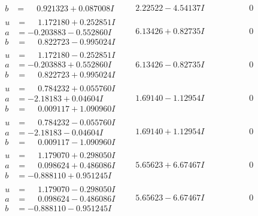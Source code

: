\documentclass[1p]{elsarticle_modified}
\theoremstyle{definition}
\begin{document}
$$\begin{array}{c|c|c}
\begin{aligned}
b &= \phantom{-}0.921323 + 0.087008 I\end{aligned}
 & \phantom{-}2.22522 - 4.54137 I & \phantom{-0.000000 } 0 \\ \hline\begin{aligned}
u &= \phantom{-}1.172180 + 0.252851 I \\
a &= -0.203883 - 0.552860 I \\
b &= \phantom{-}0.822723 - 0.995024 I\end{aligned}
 & \phantom{-}6.13426 + 0.82735 I & \phantom{-0.000000 } 0 \\ \hline\begin{aligned}
u &= \phantom{-}1.172180 - 0.252851 I \\
a &= -0.203883 + 0.552860 I \\
b &= \phantom{-}0.822723 + 0.995024 I\end{aligned}
 & \phantom{-}6.13426 - 0.82735 I & \phantom{-0.000000 } 0 \\ \hline\begin{aligned}
u &= \phantom{-}0.784232 + 0.055760 I \\
a &= -2.18183 + 0.04604 I \\
b &= \phantom{-}0.009117 + 1.090960 I\end{aligned}
 & \phantom{-}1.69140 - 1.12954 I & \phantom{-0.000000 } 0 \\ \hline\begin{aligned}
u &= \phantom{-}0.784232 - 0.055760 I \\
a &= -2.18183 - 0.04604 I \\
b &= \phantom{-}0.009117 - 1.090960 I\end{aligned}
 & \phantom{-}1.69140 + 1.12954 I & \phantom{-0.000000 } 0 \\ \hline\begin{aligned}
u &= \phantom{-}1.179070 + 0.298050 I \\
a &= \phantom{-}0.098624 + 0.486086 I \\
b &= -0.888110 + 0.951245 I\end{aligned}
 & \phantom{-}5.65623 + 6.67467 I & \phantom{-0.000000 } 0 \\ \hline\begin{aligned}
u &= \phantom{-}1.179070 - 0.298050 I \\
a &= \phantom{-}0.098624 - 0.486086 I \\
b &= -0.888110 - 0.951245 I\end{aligned}
 & \phantom{-}5.65623 - 6.67467 I & \phantom{-0.000000 } 0\\

\end{array}$$
\end{document}
